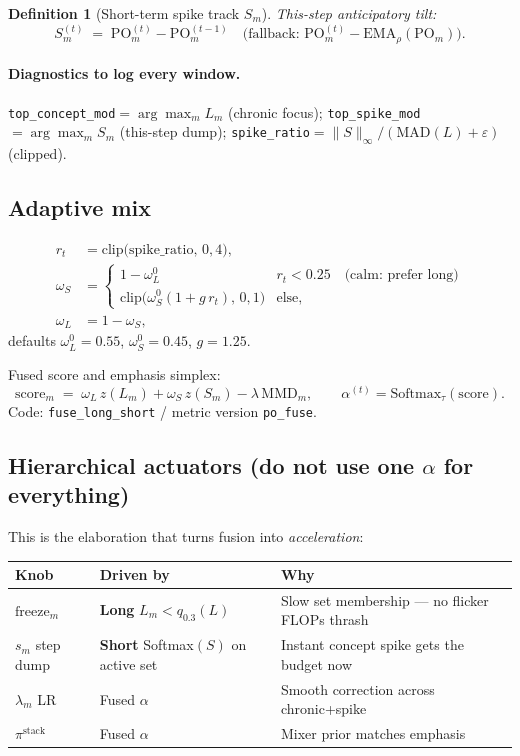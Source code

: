 \documentclass[11pt]{article}
\newtheorem{definition}{Definition}
\newcommand{\PO}{\mathrm{PO}}
\newcommand{\MMD}{\mathrm{MMD}}
\begin{document}
\begin{definition}[Short-term spike track $S_m$]
This-step anticipatory tilt:
\[
  S_m^{(t)}
  \;=\;
  \PO_m^{(t)}-\PO_m^{(t-1)}
  \quad\text{(fallback: }\PO_m^{(t)}-\mathrm{EMA}_{\rho}(\PO_m)\text{)}.
\]
\end{definition}

\paragraph{Diagnostics to log every window.}
\texttt{top\_concept\_mod}$=\arg\max_m L_m$ (chronic focus);
\texttt{top\_spike\_mod}$=\arg\max_m S_m$ (this-step dump);
\texttt{spike\_ratio}$=\|S\|_\infty / (\mathrm{MAD}(L)+\varepsilon)$
(clipped).

\subsection{Adaptive mix}
\label{sec:fuse-mix}

\[
\begin{aligned}
  r_t &= \mathrm{clip}\bigl(\mathrm{spike\_ratio},\,0,4\bigr),\\
  \omega_S &=
  \begin{cases}
    1-\omega_L^{0} & r_t < 0.25 \quad\text{(calm: prefer long)}\\
    \mathrm{clip}\bigl(\omega_S^{0}(1+g\,r_t),\,0,1\bigr) & \text{else},
  \end{cases}\\
  \omega_L &= 1-\omega_S,
\end{aligned}
\]
defaults $\omega_L^{0}{=}0.55$, $\omega_S^{0}{=}0.45$, $g{=}1.25$.

Fused score and emphasis simplex:
\[
  \mathrm{score}_m
  \;=\;
  \omega_L\,z(L_m)+\omega_S\,z(S_m)-\lambda\,\MMD_m,
  \qquad
  \alpha^{(t)}=\mathrm{Softmax}_{\tau}(\mathrm{score}).
\]
Code: \texttt{fuse\_long\_short} / metric version \texttt{po\_fuse}.

\subsection{Hierarchical actuators (do not use one $\alpha$ for everything)}
\label{sec:fuse-hier}

This is the elaboration that turns fusion into \emph{acceleration}:

\begin{center}
\small
\begin{tabular}{@{}lll@{}}
\toprule
Knob & Driven by & Why \\
\midrule
$\mathrm{freeze}_m$
  & \textbf{Long} $L_m < q_{0.3}(L)$
  & Slow set membership --- no flicker FLOPs thrash \\
$s_m$ step dump
  & \textbf{Short} Softmax$(S)$ on active set
  & Instant concept spike gets the budget now \\
$\lambda_m$ LR
  & Fused $\alpha$
  & Smooth correction across chronic+spike \\
$\pi^{\mathrm{stack}}$
  & Fused $\alpha$
  & Mixer prior matches emphasis \\
\bottomrule
\end{tabular}
\end{center}
\end{document}
